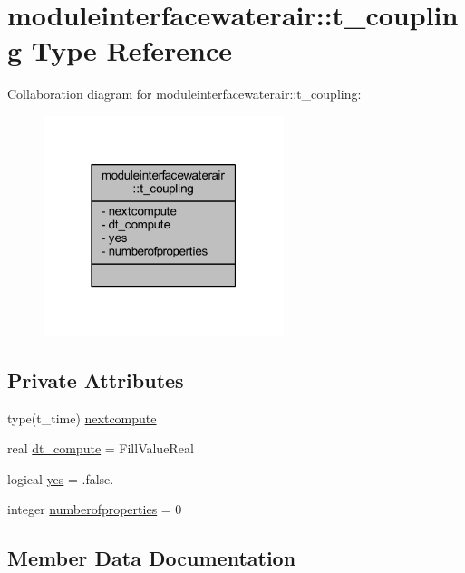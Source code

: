 \hypertarget{structmoduleinterfacewaterair_1_1t__coupling}{}\section{moduleinterfacewaterair\+:\+:t\+\_\+coupling Type Reference}
\label{structmoduleinterfacewaterair_1_1t__coupling}


Collaboration diagram for moduleinterfacewaterair\+:\+:t\+\_\+coupling\+:\nopagebreak
\begin{figure}[H]
\begin{center}
\leavevmode
\includegraphics[width=199pt]{structmoduleinterfacewaterair_1_1t__coupling__coll__graph}
\end{center}
\end{figure}
\subsection*{Private Attributes}
\begin{DoxyCompactItemize}
\item 
type(t\+\_\+time) \mbox{\hyperlink{structmoduleinterfacewaterair_1_1t__coupling_a2b2f089c591e6acf1ca901ff467742a8}{nextcompute}}
\item 
real \mbox{\hyperlink{structmoduleinterfacewaterair_1_1t__coupling_a7edbf3e4294d75556d0fde5f4a113a14}{dt\+\_\+compute}} = Fill\+Value\+Real
\item 
logical \mbox{\hyperlink{structmoduleinterfacewaterair_1_1t__coupling_a94a105df87d96e0141fc18719a054d00}{yes}} = .false.
\item 
integer \mbox{\hyperlink{structmoduleinterfacewaterair_1_1t__coupling_ada7e98b71b831665c9600122566997fa}{numberofproperties}} = 0
\end{DoxyCompactItemize}


\subsection{Member Data Documentation}
\mbox{\label{structmoduleinterfacewaterair_1_1t__coupling_a7edbf3e4294d75556d0fde5f4a113a14}} 
